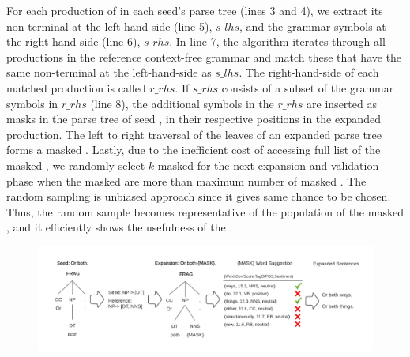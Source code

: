 


For each production of in each seed's parse tree (lines 3 and 4), we
extract its non-terminal at the left-hand-side (line 5), $s\_lhs$, and
the grammar symbols at the right-hand-side (line 6), $s\_rhs$. In line
7, the algorithm iterates through all productions in the reference
context-free grammar and match these that have the same non-terminal
at the left-hand-side as $s\_lhs$.  The right-hand-side of each
matched production is called $r\_rhs$.  If $s\_rhs$ consists of a
subset of the grammar symbols in $r\_rhs$ (line 8), the additional
symbols in the $r\_rhs$ are inserted as masks in the parse tree of
seed \sent, in their respective positions in the expanded production.
The left to right traversal of the leaves of an expanded parse tree
forms a masked \sent.  Lastly, due to the inefficient cost of
accessing full list of the masked \sents, we randomly select $k$
masked \sents for the next \sent expansion and validation phase when
the masked \sents are more than maximum number of masked \sents. The
random sampling is unbiased approach since it gives same chance to be
chosen. Thus, the random sample becomes representative of the
population of the masked \sents, and it efficiently shows the
usefulness of the \tool.

\begin{figure}[t]
  \centering
  \includegraphics[scale=0.7]{figs/running_example.pdf}
  \caption{\RunningExCaption}
\end{figure}

